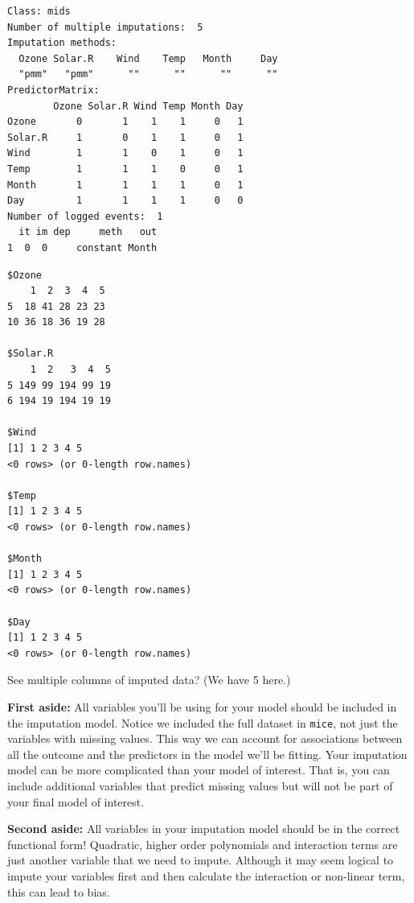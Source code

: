 \documentclass[
  letterpaper,
  DIV=11,
  numbers=noendperiod]{scrreprt}
\newenvironment{Shaded}{\begin{snugshade}}{\end{snugshade}}
\newcommand{\NormalTok}[1]{\textcolor[rgb]{0.00,0.44,0.13}{#1}}
\newcommand{\SpecialCharTok}[1]{\textcolor[rgb]{0.25,0.44,0.63}{#1}}
\begin{document}
\begin{verbatim}
Class: mids
Number of multiple imputations:  5 
Imputation methods:
  Ozone Solar.R    Wind    Temp   Month     Day 
  "pmm"   "pmm"      ""      ""      ""      "" 
PredictorMatrix:
        Ozone Solar.R Wind Temp Month Day
Ozone       0       1    1    1     0   1
Solar.R     1       0    1    1     0   1
Wind        1       1    0    1     0   1
Temp        1       1    1    0     0   1
Month       1       1    1    1     0   1
Day         1       1    1    1     0   0
Number of logged events:  1 
  it im dep     meth   out
1  0  0     constant Month
\end{verbatim}

\begin{Shaded}
\end{Shaded}

\begin{verbatim}
$Ozone
    1  2  3  4  5
5  18 41 28 23 23
10 36 18 36 19 28

$Solar.R
    1  2   3  4  5
5 149 99 194 99 19
6 194 19 194 19 19

$Wind
[1] 1 2 3 4 5
<0 rows> (or 0-length row.names)

$Temp
[1] 1 2 3 4 5
<0 rows> (or 0-length row.names)

$Month
[1] 1 2 3 4 5
<0 rows> (or 0-length row.names)

$Day
[1] 1 2 3 4 5
<0 rows> (or 0-length row.names)
\end{verbatim}

See multiple columns of imputed data? (We have 5 here.)

\textbf{First aside:} All variables you'll be using for your model
should be included in the imputation model. Notice we included the full
dataset in \texttt{mice}, not just the variables with missing values.
This way we can account for associations between all the outcome and the
predictors in the model we'll be fitting. Your imputation model can be
more complicated than your model of interest. That is, you can include
additional variables that predict missing values but will not be part of
your final model of interest.

\textbf{Second aside:} All variables in your imputation model should be
in the correct functional form! Quadratic, higher order polynomials and
interaction terms are just another variable that we need to impute.
Although it may seem logical to impute your variables first and then
calculate the interaction or non-linear term, this can lead to bias.
\end{document}

